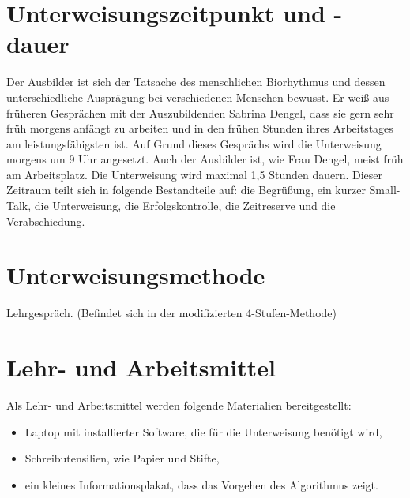 \section{Unterweisungszeitpunkt und -dauer}
Der Ausbilder ist sich der Tatsache des menschlichen Biorhythmus und dessen unterschiedliche Ausprägung bei verschiedenen Menschen bewusst. Er weiß aus früheren Gesprächen mit der Auszubildenden Sabrina Dengel, dass sie gern sehr früh morgens anfängt zu arbeiten und in den frühen Stunden ihres Arbeitstages am leistungsfähigsten ist. Auf Grund dieses Gesprächs wird die Unterweisung morgens um 9 Uhr angesetzt. Auch der Ausbilder ist, wie Frau Dengel, meist früh am Arbeitsplatz. Die Unterweisung wird maximal 1,5 Stunden dauern. Dieser Zeitraum teilt sich in folgende Bestandteile auf: die Begrüßung, ein kurzer Small-Talk, die Unterweisung, die Erfolgskontrolle, die Zeitreserve und die Verabschiedung.   

\section{Unterweisungsmethode}
Lehrgespräch. (Befindet sich in der modifizierten 4-Stufen-Methode)

\section{Lehr- und Arbeitsmittel}
Als Lehr- und Arbeitsmittel werden folgende Materialien bereitgestellt: 
\begin{itemize}
	\item Laptop mit installierter Software, die für die Unterweisung benötigt wird,
	\item Schreibutensilien, wie Papier und Stifte, 
	\item ein kleines Informationsplakat, dass das Vorgehen des Algorithmus zeigt.
\end{itemize}


